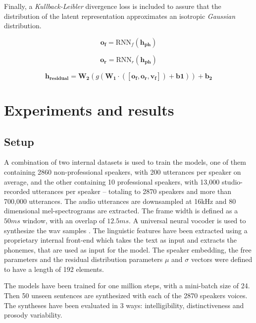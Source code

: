 Finally, a \textit{Kullback-Leibler} divergence loss is included to assure that the distribution of the latent representation approximates an isotropic \textit{Gaussian} distribution.

\begin{equation}
 \label{eq:rnn1}
\mathbf{o_f} = \text{RNN}_f(\mathbf{h_{ph}})
\end{equation}

\begin{equation}
 \label{eq:rnn2}
\mathbf{o_r} = \text{RNN}_r(\mathbf{h_{ph}})
\end{equation}

\begin{equation}
 \label{eq:residual}
\mathbf{h_{residual}} = \mathbf{W_2}(g(\mathbf{W_1}\cdot([\mathbf{o_f}, \mathbf{o_r}, \mathbf{v_f}]) + \mathbf{b1} )) +\mathbf{ b_2}
\end{equation}

\section{Experiments and results}
\subsection{Setup}
 A combination of two internal datasets is used to train the models, one of them containing 2860 non-professional speakers, with 200 utterances per speaker on average, and the other containing 10 professional speakers, with 13,000 studio-recorded utterances per speaker – totaling to 2870 speakers and more than 700,000 utterances. The audio utterances are downsampled at 16kHz and 80 dimensional mel-spectrograms are extracted. The frame width is defined as a $50ms$ window, with an overlap of $12.5ms$. A universal neural vocoder is used to synthesize the wav samples \autocite{lorenzotrueba2019}. The linguistic features have been extracted using a proprietary internal front-end which takes the text as input and extracts the phonemes, that are used as input for the model. The speaker embedding, the free parameters and the residual distribution parameters $\mu$ and $\sigma$ vectors were defined to have a length of 192 elements.

 The models have been trained for one million steps, with a mini-batch size of 24. Then 50 unseen sentences are synthesized with each of the 2870 speakers voices. The syntheses have been evaluated in 3 ways: intelligibility, distinctiveness and prosody variability.


